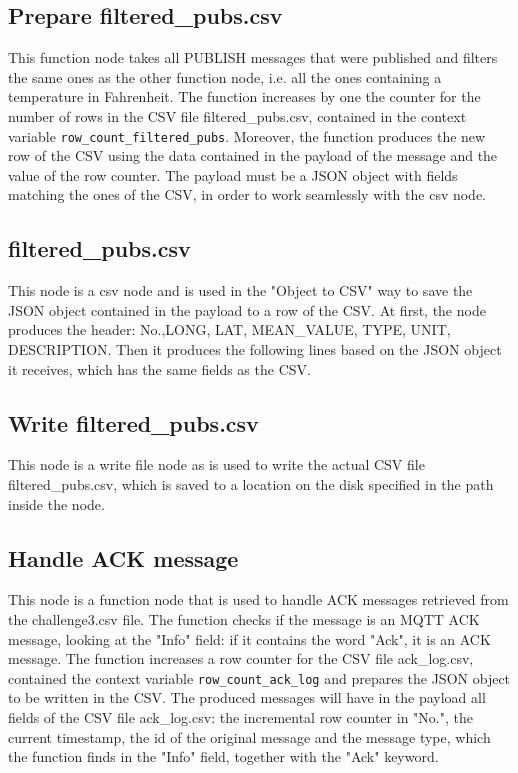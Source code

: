 \subsection{Prepare filtered\_pubs.csv}
This function node takes all PUBLISH messages that were published and filters the same ones as the other function node, i.e. all the ones containing a temperature in Fahrenheit. The function increases by one the counter for the number of rows in the CSV file filtered\_pubs.csv, contained in the context variable \verb|row_count_filtered_pubs|. Moreover, the function produces the new row of the CSV using the data contained in the payload of the message and the value of the row counter. The payload must be a JSON object with fields matching the ones of the CSV, in order to work seamlessly with the csv node.

\subsection{filtered\_pubs.csv}
This node is a csv node and is used in the "Object to CSV" way to save the JSON object contained in the payload to a row of the CSV. At first, the node produces the header: No.,LONG, LAT, MEAN\_VALUE, TYPE, UNIT, DESCRIPTION. Then it produces the following lines based on the JSON object it receives, which has the same fields as the CSV.

\subsection{Write filtered\_pubs.csv}
This node is a write file node as is used to write the actual CSV file filtered\_pubs.csv, which is saved to a location on the disk specified in the path inside the node.

\subsection{Handle ACK message}
This node is a function node that is used to handle ACK messages retrieved from the challenge3.csv file. The function checks if the message is an MQTT ACK message, looking at the "Info" field: if it contains the word "Ack", it is an ACK message. The function increases a row counter for the CSV file ack\_log.csv, contained the context variable \verb|row_count_ack_log| and prepares the JSON object to be written in the CSV. The produced messages will have in the payload all fields of the CSV file ack\_log.csv: the incremental row counter in "No.", the current timestamp, the id of the original message and the message type, which the function finds in the "Info" field, together with the "Ack" keyword.

